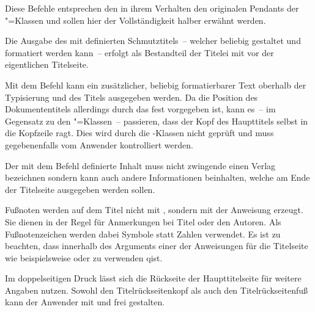 \documentclass[%
  english,ngerman,%
  headings=optiontoheadandtoc,captions=tableheading,numbers=noenddot,%
  chapterpage,cdfoot,%
]{tudscrman}
\begin{document}
\begin{Declaration}{}
\begin{Declaration}{}
\begin{Declaration}{}
\begin{Declaration}{}
\begin{Declaration}{}
\begin{Declaration}{}
\begin{Declaration}{}
\printdeclarationlist%
%
Diese Befehle entsprechen den in ihrem Verhalten den originalen Pendants der 
\KOMAScript"=Klassen{} und sollen hier der Vollständigkeit halber erwähnt 
werden.

Die Ausgabe des mit  definierten Schmutztitels~-- welcher 
beliebig gestaltet und formatiert werden kann~-- erfolgt als Bestandteil der 
Titelei mit  vor der eigentlichen Titelseite.

Mit dem Befehl  kann ein zusätzlicher, beliebig 
formatierbarer Text oberhalb der Typisierung und des Titels ausgegeben werden. 
Da die Position des Dokumententitels allerdings durch das \CD fest 
vorgegeben ist, kann es~-- im Gegensatz zu den \KOMAScript"=Klassen~-- 
passieren, dass der Kopf des Haupttitels selbst in die Kopfzeile ragt. Dies wird 
durch die \TUDScript-Klassen nicht geprüft und muss gegebenenfalls vom Anwender 
kontrolliert werden.

Der mit dem Befehl  definierte Inhalt muss nicht zwingende 
einen Verlag bezeichnen sondern kann auch andere Informationen beinhalten, 
welche am Ende der Titelseite ausgegeben werden sollen.

Fußnoten werden auf dem Titel nicht mit , sondern mit der 
Anweisung  erzeugt. Sie dienen in der Regel für Anmerkungen bei 
Titel oder den Autoren. Als Fußnotenzeichen werden dabei Symbole statt Zahlen 
verwendet. Es ist zu beachten, dass  innerhalb des Arguments 
einer der Anweisungen für die Titelseite wie beispielsweise  oder 
 zu verwenden qist.

%
Im doppelseitigen Druck lässt sich die Rückseite der Haupttitelseite für 
weitere Angaben nutzen. Sowohl den Titelrückseitenkopf als auch den
Titelrückseitenfuß kann der Anwender mit  und 
 frei gestalten.


\end{Declaration}
\end{Declaration}
\end{Declaration}
\end{Declaration}
\end{Declaration}
\end{Declaration}
\end{Declaration}
\end{document}
